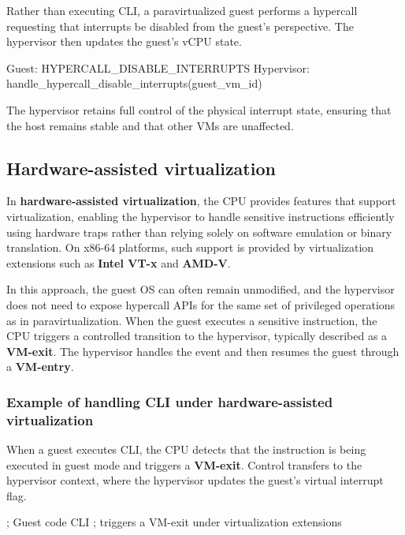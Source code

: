\documentclass[11pt,a4paper,openany]{report}
\begin{document}
Rather than executing CLI, a paravirtualized guest performs a hypercall requesting that interrupts be disabled from the guest's perspective. The hypervisor then updates the guest's vCPU state.

\begin{codeblock}
Guest:      HYPERCALL_DISABLE_INTERRUPTS
Hypervisor: handle_hypercall_disable_interrupts(guest_vm_id)
\end{codeblock}

The hypervisor retains full control of the physical interrupt state, ensuring that the host remains stable and that other VMs are unaffected.

\subsection{Hardware-assisted virtualization}

In \textbf{hardware-assisted virtualization}, the CPU provides features that support virtualization, enabling the hypervisor to handle sensitive instructions efficiently using hardware traps rather than relying solely on software emulation or binary translation. On x86-64 platforms, such support is provided by virtualization extensions such as \textbf{Intel VT-x} and \textbf{AMD-V}.

In this approach, the guest OS can often remain unmodified, and the hypervisor does not need to expose hypercall APIs for the same set of privileged operations as in paravirtualization. When the guest executes a sensitive instruction, the CPU triggers a controlled transition to the hypervisor, typically described as a \textbf{VM-exit}. The hypervisor handles the event and then resumes the guest through a \textbf{VM-entry}.

\subsubsection*{Example of handling CLI under hardware-assisted virtualization}

When a guest executes CLI, the CPU detects that the instruction is being executed in guest mode and triggers a \textbf{VM-exit}. Control transfers to the hypervisor context, where the hypervisor updates the guest's virtual interrupt flag.

\begin{codeblock}
; Guest code
CLI          ; triggers a VM-exit under virtualization extensions
\end{codeblock}
\end{document}
